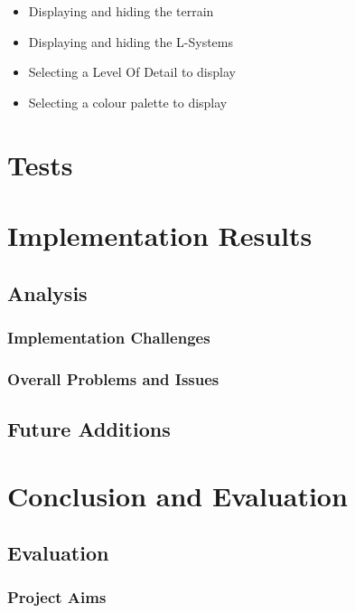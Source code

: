 \documentclass[a4paper,10pt]{report}
\begin{document}
\begin{itemize}
    \item Displaying and hiding the terrain
    \item Displaying and hiding the L-Systems
    \item Selecting a Level Of Detail to display
    \item Selecting a colour palette to display
\end{itemize}

\chapter{Tests}

\chapter{Implementation Results}
\section{Analysis}

\subsection{Implementation Challenges}
\subsection{Overall Problems and Issues}
\section{Future Additions}

\chapter{Conclusion and Evaluation}
\section{Evaluation}
\subsection{Project Aims}


\clearpage


\end{document}
